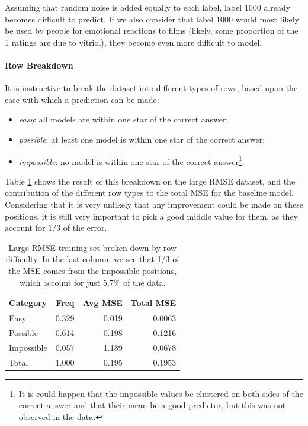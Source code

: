 \documentclass{article}
\begin{document}
Assuming that random noise is added equally to each label, label 1000 already becomes difficult to predict.  If we also consider that label 1000 would most likely be used by people for emotional reactions to films (likely, some proportion of the 1 ratings are due to vitriol), they become even more difficult to model.

\paragraph{Row Breakdown}
It is instructive to break the dataset into different types of rows, based upon the ease with which a prediction can be made:
\begin{itemize}
\item \emph{easy}: all models are within one star of the correct answer;
\item \emph{possible}: at least one model is within one star of the correct answer;
\item \emph{impossible}: no model is within one star of the correct answer\footnote{It is could happen that the impossible values be clustered on both sides of the correct answer and that their mean be a good predictor, but this was not observed in the data.}.
\end{itemize}

Table \ref{table:row-types-rmse} shows the result of this breakdown on the large RMSE dataset, and the contribution of the different row types to the total MSE for the baseline model.  Considering that it is very unlikely that any improvement could be made on these positions, it is still very important to pick a good middle value for them, as they account for $1/3$ of the error. 

\begin{table}[t]
\caption{Large RMSE training set broken down by row difficulty.  In the last column, we see that 1/3 of the MSE comes from the impossible positions, which account for just 5.7\% of the data.}
\label{table:row-types-rmse}
\vskip 0.15in
\begin{center}
\begin{small}
\begin{sc}
\begin{tabular}{lrrr}
\hline
\abovespace\belowspace
Category & Freq & Avg MSE & Total MSE \\
\hline
\abovespace
Easy          & 0.329 & 0.019 & 0.0063 \\
Possible      & 0.614 & 0.198 & 0.1216 \\
Impossible    & 0.057 & 1.189 & 0.0678 \\
\abovespace\belowspace
Total         & 1.000 & 0.195 & 0.1953 \\
\hline
\end{tabular}
\end{sc}
\end{small}
\end{center}
\vskip -0.1in
\end{table}
\end{document}
